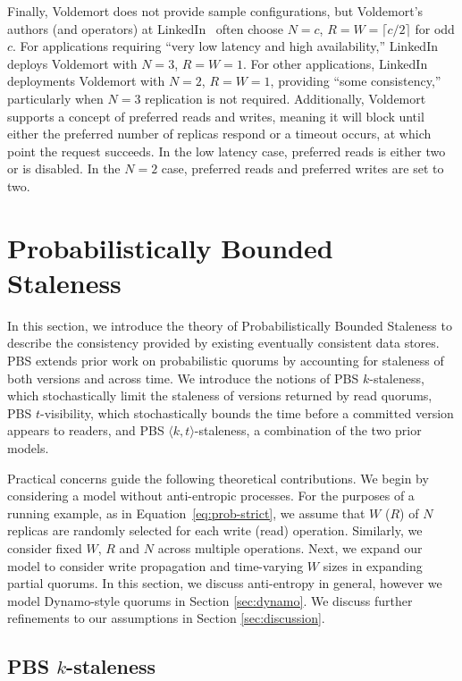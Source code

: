 \documentclass{vldb}
\begin{document}
 Finally, Voldemort does not provide sample configurations, but
 Voldemort's authors (and operators) at LinkedIn~\cite{feinbergpc}
 often choose $N$$=$$c$, $R$$=$$W$$=$$ \lceil c/2 \rceil$ for odd $c$.
 For applications requiring ``very low latency and high
 availability,'' LinkedIn deploys Voldemort with $N$$=$$3$,
 $R$$=$$W$$=$$1$.  For other applications, LinkedIn deployments
 Voldemort with $N$$=$$2$, $R$$=$$W$$=$$1$, providing ``some
 consistency,'' particularly when $N$$=$$3$ replication is not
 required.  Additionally, Voldemort supports a concept of preferred
 reads and writes, meaning it will block until either the preferred
 number of replicas respond or a timeout occurs, at which point the
 request succeeds.  In the low latency case, preferred reads is either
 two or is disabled.  In the $N$$=$$2$ case, preferred reads and
 preferred writes are set to two.


\section{Probabilistically Bounded\\Staleness}
\label{sec:pbs}

In this section, we introduce the theory of Probabilistically Bounded
Staleness to describe the consistency provided by existing eventually
consistent data stores.  PBS extends prior work on
probabilistic quorums by accounting for staleness of both versions and
across time.  We introduce the notions of PBS $k$-staleness, which
stochastically limit the staleness of versions returned by read
quorums, PBS $t$-visibility, which stochastically bounds the time
before a committed version appears to readers, and PBS $\langle k,
t \rangle$-staleness, a combination of the two prior models.


Practical concerns guide the following theoretical contributions.  We
begin by considering a model without anti-entropic processes.  For the
purposes of a running example, as in Equation~\ref{eq:prob-strict}, we
assume that $W$ ($R$) of $N$ replicas are randomly selected for each
write (read) operation.  Similarly, we consider fixed $W$, $R$ and $N$
across multiple operations. Next, we expand our model to consider
write propagation and time-varying $W$ sizes in expanding partial
quorums.  In this section, we discuss anti-entropy in general, however
we model Dynamo-style quorums in Section \ref{sec:dynamo}. We discuss
further refinements to our assumptions in Section
\ref{sec:discussion}.

\subsection{PBS $k$-staleness}
\end{document}
